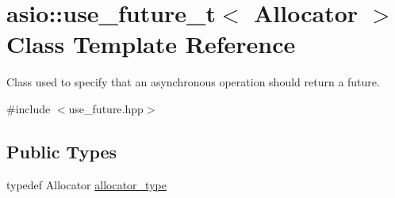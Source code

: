 \hypertarget{classasio_1_1use__future__t}{}\section{asio\+:\+:use\+\_\+future\+\_\+t$<$ Allocator $>$ Class Template Reference}
\label{classasio_1_1use__future__t}


Class used to specify that an asynchronous operation should return a future.  




{\ttfamily \#include $<$use\+\_\+future.\+hpp$>$}

\subsection*{Public Types}
\begin{DoxyCompactItemize}
\item 
typedef Allocator \hyperlink{classasio_1_1use__future__t_a5f26423d6034eeba715c1249646c4700}{allocator\+\_\+type}
\end{DoxyCompactItemize}
